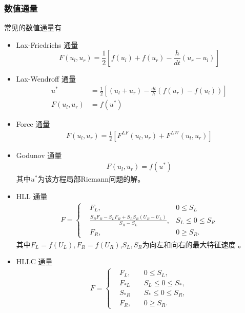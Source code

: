 \documentclass[8pt,mathserif]{beamer}
\begin{document}
\begin{frame}
  \frametitle{数值通量}
  常见的数值通量有
  \begin{itemize}
    \item Lax-Friedrichs 通量 
      \begin{equation*}
        F(u_l,u_r)=\frac 12[f(u_l)+f(u_r) - \frac{h}{dt}(u_r-u_l)]
      \end{equation*}
    \item Lax-Wendroff 通量 
      \begin{align*}
        u^* &= \frac 12 [(u_l+u_r) -\frac{dt}{h}(f(u_r)-f(u_l))] \\
        F(u_l,u_r) &=  f(u^*)
      \end{align*}
    \item Force 通量 
      \begin{align*}
      F(u_l,u_r) = \frac 12 [F^{LF}(u_l,u_r)+F^{LW}(u_l,u_r)]
    \end{align*}
    \item Godunov 通量 
      \begin{align*}
        F(u_l,u_r) = f(u^*)
      \end{align*}
      其中$u^*$为该方程局部Riemann问题的解。
  \end{itemize}
\end{frame}
\begin{frame}
  \begin{itemize}
    \item HLL 通量
      \begin{align*} 
        F=\left\{
        \begin{aligned}
          &F_L,\quad & 0\leq S_L\\
          &\frac{S_RF_R-S_LF_R+S_LS_R(U_R-U_L)}{S_R-S_L}, &
          S_L\leq 0\leq S_R \\
          &F_R, & 0\geq S_R.
        \end{aligned} 
        \right.
      \end{align*}
      其中$F_L=f(U_L),F_R=f(U_R)$,$S_L,S_R$为向左和向右的最大特征速度
      。
    \item HLLC 通量 
      \begin{align*}
        F=\left\{
        \begin{aligned}
          &F_L,\quad &0\leq S_L, \\
          &F_{*L}     &S_L\leq 0 \leq S_*,\\
          &S_{*R}    &S_*\leq 0\leq S_R,\\
          &F_R, & 0\geq S_R.
        \end{aligned}
        \right.
      \end{align*}
  \end{itemize}
\end{frame}
\end{document}
